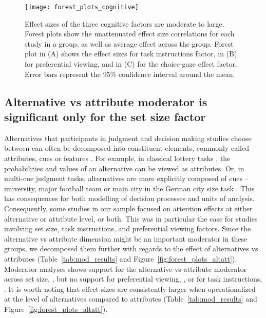 \begin{figure}[!h]
\texttt{[image: forest\_plots\_cognitive]}
\centering
\caption{Effect sizes of the three cognitive factors are moderate to large. Forest plots show the unattenuated effect size correlations for each study in a group, as well as average effect across the group. Forest plot in (A) shows the effect sizes for task instructions factor, in (B) for preferential viewing, and in (C) for the choice-gaze effect factor. Error bars represent the 95\% confidence interval around the mean.}
\label{fig:forest_plots_cognitive}
\end{figure}


\subsection{Alternative vs attribute moderator is significant only for the set size factor}

Alternatives that participants in judgment and decision making studies choose between can often be decomposed into constituent elements, commonly called attributes, cues or features \citep{payne1988,tversky1972elimination,stojic2020s,gigerenzer1996reasoning,schulz2018putting,hogarth2007heuristic}. For example, in classical lottery tasks \citep{tversky1979}, the probabilities and values of an alternative can be viewed as attributes. Or, in multi-cue judgment tasks, alternatives are more explicitly composed of cues -- university, major football team or main city in the German city size task \citep{gigerenzer1996reasoning}. This has consequences for both modelling of decision processes and units of analysis. Consequently, some studies in our sample focused on attention effects at either alternative or attribute level, or both. This was in particular the case for studies involving set size, task instructions, and preferential viewing factors. Since the alternative vs attribute dimension might be an important moderator in these groups, we decomposed them further with regards to the effect of alternatives vs attributes (Table~\ref{tab:mod_results} and Figure~\ref{fig:forest_plots_altatt}). Moderator analyses shows support for the alternative vs attribute moderator across set size, \unskip, but no support for preferential viewing, \unskip, or for task instructions, \unskip. It is worth noting that effect sizes are consistently larger when operationalized at the level of alternatives compared to attributes (Table~\ref{tab:mod_results} and Figure~\ref{fig:forest_plots_altatt}). 


